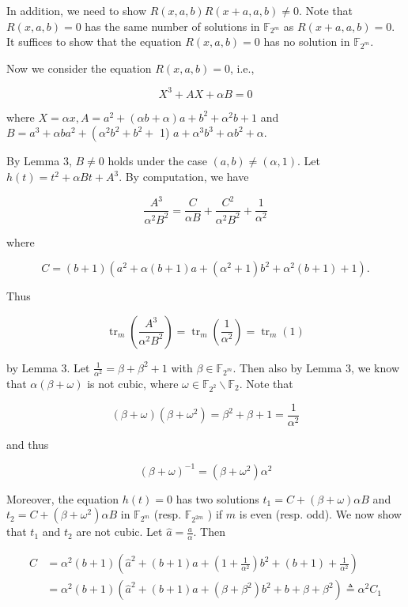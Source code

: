 \documentclass[10pt]{article}
\begin{document}
In addition, we need to show $R(x, a, b) R(x+a, a, b) \neq 0$. Note that $R(x, a, b)=0$ has the same number of solutions in $\mathbb{F}_{2^{m}}$ as $R(x+a, a, b)=0$. It suffices to show that the equation $R(x, a, b)=0$ has no solution in $\mathbb{F}_{2^{m}}$.

Now we consider the equation $R(x, a, b)=0$, i.e.,


\begin{equation*}
X^{3}+A X+\alpha B=0 \tag{10}
\end{equation*}


where $X=\alpha x, A=a^{2}+(\alpha b+\alpha) a+b^{2}+\alpha^{2} b+1$ and $B=a^{3}+\alpha b a^{2}+\left(\alpha^{2} b^{2}+b^{2}+\right.$ 1) $a+\alpha^{3} b^{3}+\alpha b^{2}+\alpha$.

By Lemma 3, $B \neq 0$ holds under the case $(a, b) \neq(\alpha, 1)$. Let $h(t)=t^{2}+\alpha B t+A^{3}$. By computation, we have

$$
\frac{A^{3}}{\alpha^{2} B^{2}}=\frac{C}{\alpha B}+\frac{C^{2}}{\alpha^{2} B^{2}}+\frac{1}{\alpha^{2}}
$$

where

$$
C=(b+1)\left(a^{2}+\alpha(b+1) a+\left(\alpha^{2}+1\right) b^{2}+\alpha^{2}(b+1)+1\right) .
$$

Thus

$$
\operatorname{tr}_{m}\left(\frac{A^{3}}{\alpha^{2} B^{2}}\right)=\operatorname{tr}_{m}\left(\frac{1}{\alpha^{2}}\right)=\operatorname{tr}_{m}(1)
$$

by Lemma 3. Let $\frac{1}{\alpha^{2}}=\beta+\beta^{2}+1$ with $\beta \in \mathbb{F}_{2^{m}}$. Then also by Lemma 3, we know that $\alpha(\beta+\omega)$ is not cubic, where $\omega \in \mathbb{F}_{2^{2}} \backslash \mathbb{F}_{2}$. Note that

$$
(\beta+\omega)\left(\beta+\omega^{2}\right)=\beta^{2}+\beta+1=\frac{1}{\alpha^{2}}
$$

and thus


\begin{equation*}
(\beta+\omega)^{-1}=\left(\beta+\omega^{2}\right) \alpha^{2} \tag{11}
\end{equation*}


Moreover, the equation $h(t)=0$ has two solutions $t_{1}=C+(\beta+\omega) \alpha B$ and $t_{2}= C+\left(\beta+\omega^{2}\right) \alpha B$ in $\mathbb{F}_{2^{m}}$ (resp. $\mathbb{F}_{2^{2 m}}$ ) if $m$ is even (resp. odd). We now show that $t_{1}$ and $t_{2}$ are not cubic. Let $\hat{a}=\frac{a}{\alpha}$. Then

$$
\begin{aligned}
C & =\alpha^{2}(b+1)\left(\hat{a}^{2}+(b+1) \hat{a}+\left(1+\frac{1}{\alpha^{2}}\right) b^{2}+(b+1)+\frac{1}{\alpha^{2}}\right) \\
& =\alpha^{2}(b+1)\left(\hat{a}^{2}+(b+1) \hat{a}+\left(\beta+\beta^{2}\right) b^{2}+b+\beta+\beta^{2}\right) \triangleq \alpha^{2} C_{1}
\end{aligned}
$$
\end{document}
